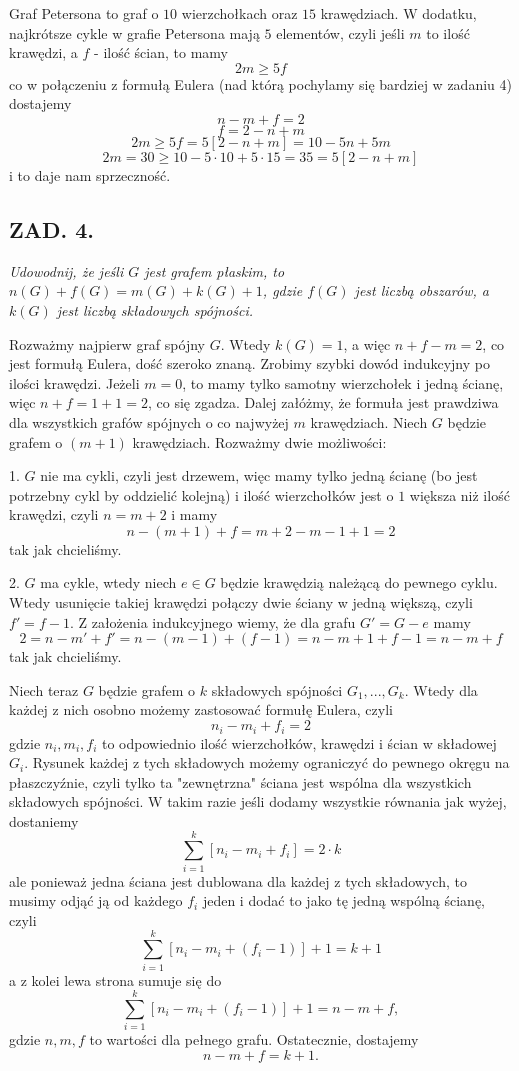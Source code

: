 \documentclass{article}
\begin{document}
Graf Petersona to graf o $10$ wierzchołkach oraz $15$ krawędziach. W dodatku, najkrótsze cykle w grafie Petersona mają $5$ elementów, czyli jeśli $m$ to ilość krawędzi, a $f$ - ilość ścian, to mamy
$$2m\geq 5f$$
co w połączeniu z formułą Eulera (nad którą pochylamy się bardziej w zadaniu 4) dostajemy
$$n-m+f=2$$
$$f=2-n+m$$
$$2m\geq 5f=5[2-n+m]=10-5n+5m$$
$$2m=30\geq 10-5\cdot10+5\cdot 15=35=5[2-n+m]$$
i to daje nam sprzeczność.

\subsection*{ZAD. 4.}
\emph{Udowodnij, że jeśli $G$ jest grafem płaskim, to $n(G)+f(G)=m(G)+k(G)+1$, gdzie $f(G)$ jest liczbą obszarów, a $k(G)$ jest liczbą składowych spójności.}
\medskip

\medskip

Rozważmy najpierw graf spójny $G$. Wtedy $k(G)=1$, a więc $n+f-m=2$, co jest formułą Eulera, dość szeroko znaną. Zrobimy szybki dowód indukcyjny po ilości krawędzi. Jeżeli $m=0$, to mamy tylko samotny wierzchołek i jedną ścianę, więc $n+f=1+1=2$, co się zgadza. Dalej załóżmy, że formuła jest prawdziwa dla wszystkich grafów spójnych o co najwyżej $m$ krawędziach. Niech $G$ będzie grafem o $(m+1)$ krawędziach. Rozważmy dwie możliwości:
\smallskip

1. $G$ nie ma cykli, czyli jest drzewem, więc mamy tylko jedną ścianę (bo jest potrzebny cykl by oddzielić kolejną) i ilość wierzchołków jest o $1$ większa niż ilość krawędzi, czyli $n=m+2$ i mamy 
$$n-(m+1)+f=m+2-m-1+1=2$$
tak jak chcieliśmy.
\smallskip

2. $G$ ma cykle, wtedy niech $e\in G$ będzie krawędzią należącą do pewnego cyklu. Wtedy usunięcie takiej krawędzi połączy dwie ściany w jedną większą, czyli $f'=f-1$. Z założenia indukcyjnego wiemy, że dla grafu $G'=G-e$ mamy
$$2=n-m'+f'=n-(m-1)+(f-1)=n-m+1+f-1=n-m+f$$
tak jak chcieliśmy.
\bigskip

\bigskip

Niech teraz $G$ będzie grafem o $k$ składowych spójności $G_1,...,G_k$. Wtedy dla każdej z nich osobno możemy zastosować formułę Eulera, czyli
$$n_i-m_i+f_i=2$$
gdzie $n_i,m_i,f_i$ to odpowiednio ilość wierzchołków, krawędzi i ścian w składowej $G_i$. Rysunek każdej z tych składowych możemy ograniczyć do pewnego okręgu na płaszczyźnie, czyli tylko ta "zewnętrzna" ściana jest wspólna dla wszystkich składowych spójności. W takim razie jeśli dodamy wszystkie równania jak wyżej, dostaniemy
$$\sum\limits_{i=1}^k[n_i-m_i+f_i]=2\cdot k$$
ale ponieważ jedna ściana jest dublowana dla każdej z tych składowych, to musimy odjąć ją od każdego $f_i$ jeden i dodać to jako tę jedną wspólną ścianę, czyli
$$\sum\limits_{i=1}^k[n_i-m_i+(f_i-1)]+1=k+1$$
a z kolei lewa strona sumuje się do
$$\sum\limits_{i=1}^k[n_i-m_i+(f_i-1)]+1=n-m+f,$$
gdzie $n,m,f$ to wartości dla pełnego grafu. Ostatecznie, dostajemy
$$n-m+f=k+1.$$
\end{document}
